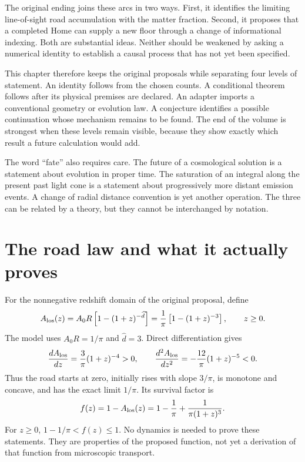 The original ending joins these arcs in two ways. First, it identifies the limiting line-of-sight road accumulation with the matter fraction. Second, it proposes that a completed Home can supply a new floor through a change of informational indexing. Both are substantial ideas. Neither should be weakened by asking a numerical identity to establish a causal process that has not yet been specified.

This chapter therefore keeps the original proposals while separating four levels of statement. An identity follows from the chosen counts. A conditional theorem follows after its physical premises are declared. An adapter imports a conventional geometry or evolution law. A conjecture identifies a possible continuation whose mechanism remains to be found. The end of the volume is strongest when these levels remain visible, because they show exactly which result a future calculation would add.

The word ``fate'' also requires care. The future of a cosmological solution is a statement about evolution in proper time. The saturation of an integral along the present past light cone is a statement about progressively more distant emission events. A change of radial distance convention is yet another operation. The three can be related by a theory, but they cannot be interchanged by notation.

\section{The road law and what it actually proves}
For the nonnegative redshift domain of the original proposal, define
\begin{equation}
 A_{\rm los}(z)=A_0R\left[1-(1+z)^{-\widehat d}\right]
 =\frac1\pi\left[1-(1+z)^{-3}\right],\qquad z\geq0.
 \label{c12:road}
\end{equation}
The model uses $A_0R=1/\pi$ and $\widehat d=3$. Direct differentiation gives
\begin{equation}
 \frac{dA_{\rm los}}{dz}=\frac3\pi(1+z)^{-4}>0,
 \qquad
 \frac{d^2A_{\rm los}}{dz^2}=-\frac{12}\pi(1+z)^{-5}<0.
 \label{c12:roadderivatives}
\end{equation}
Thus the road starts at zero, initially rises with slope $3/\pi$, is monotone and concave, and has the exact limit $1/\pi$. Its survival factor is
\begin{equation}
 f(z)=1-A_{\rm los}(z)=1-\frac1\pi+\frac1{\pi(1+z)^3}.
 \label{c12:survival}
\end{equation}
For $z\geq0$, $1-1/\pi<f(z)\leq1$. No dynamics is needed to prove these statements. They are properties of the proposed function, not yet a derivation of that function from microscopic transport.

